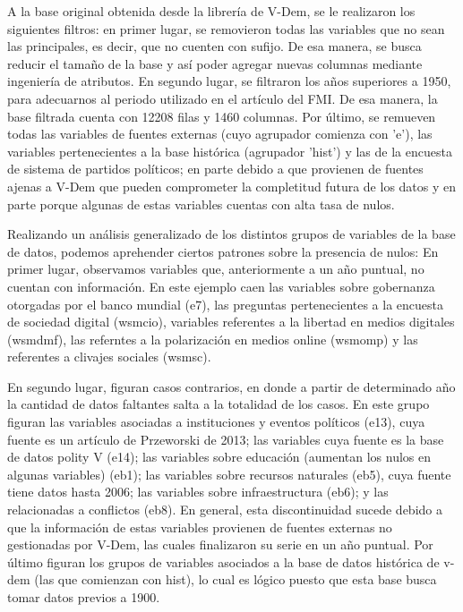 \documentclass{article}
\begin{document}
A la base original obtenida desde la librería de V-Dem, se le realizaron los
siguientes filtros: en primer lugar, se removieron todas las variables que
no sean las principales, es decir, que no cuenten con sufijo. De esa manera,
se busca reducir el tamaño de la base y así poder agregar nuevas columnas
mediante ingeniería de atributos. En segundo lugar, se filtraron los años 
superiores a 1950, para adecuarnos al periodo utilizado en el artículo del FMI.
De esa manera, la base filtrada cuenta con 12208 filas y 1460 columnas. Por último,
se remueven todas las variables de fuentes externas (cuyo agrupador comienza con
'e'), las variables pertenecientes a la base histórica (agrupador 'hist') y las
de la encuesta de sistema de partidos políticos; en parte debido a que provienen
de fuentes ajenas a V-Dem que pueden comprometer la completitud futura de los datos
y en parte porque algunas de estas variables cuentas con alta tasa de nulos.

Realizando un análisis generalizado de los distintos grupos de variables de la base de
datos, podemos aprehender ciertos patrones sobre la presencia de nulos: 
En primer lugar, observamos variables que,
anteriormente a un año puntual, no cuentan con información. En este ejemplo caen
las variables sobre gobernanza otorgadas por el banco mundial (e7), las preguntas
pertenecientes a la encuesta de sociedad digital (wsmcio), variables referentes a
la libertad en medios digitales (wsmdmf), las referntes a la polarización en medios
online (wsmomp) y las referentes a clivajes sociales (wsmsc).

En segundo lugar, figuran casos contrarios, en donde a partir de determinado año
la cantidad de datos faltantes salta a la totalidad de los casos. En este grupo
figuran las variables asociadas a instituciones y eventos políticos (e13), cuya 
fuente es un artículo de Przeworski de 2013; las variables cuya fuente es la base
de datos polity V (e14); las variables sobre educación (aumentan los nulos en 
algunas variables) (eb1); las variables sobre recursos naturales (eb5), cuya fuente 
tiene datos hasta 2006; las variables sobre infraestructura (eb6); y las relacionadas 
a conflictos (eb8). En general, esta discontinuidad sucede debido a que la 
información de estas variables provienen de fuentes externas no gestionadas por 
V-Dem, las cuales finalizaron su serie en un año puntual. Por último figuran los 
grupos de variables asociados a la base de datos histórica de v-dem (las que comienzan 
con hist), lo cual es lógico puesto que esta base busca tomar datos previos a 1900.
\end{document}
